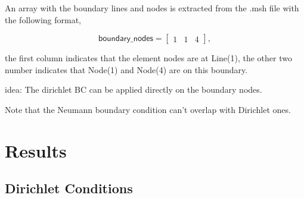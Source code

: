 \documentclass[10pt, a4paper]{article}
\begin{document}
An array with the boundary lines and nodes is extracted from the \textsf{.msh} file with the following format,

\begin{equation*}
\textsf{boundary}\_\textsf{nodes} = \begin{bmatrix}
1 & 1 & 4
\end{bmatrix},
\end{equation*}

the first column indicates that the element nodes are at Line(1), the other two number indicates that Node(1) and Node(4) are on this boundary.

idea: The dirichlet BC can be applied directly on the boundary nodes. 

Note that the Neumann boundary condition can't overlap with Dirichlet ones.

\section{Results}

\subsection{Dirichlet Conditions}
\end{document}
